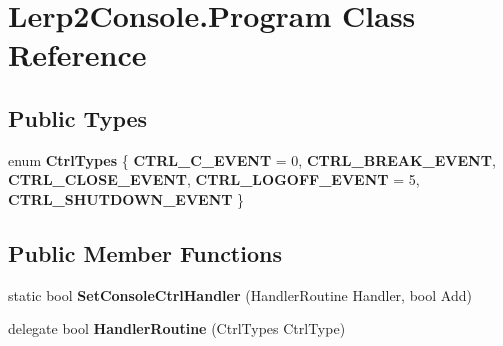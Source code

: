 \hypertarget{class_lerp2_console_1_1_program}{}\section{Lerp2\+Console.\+Program Class Reference}
\label{class_lerp2_console_1_1_program}
\subsection*{Public Types}
\begin{DoxyCompactItemize}
\item 
\mbox{\label{class_lerp2_console_1_1_program_a6449c3395adb6c08eee64948ff31cf41}} 
enum {\bfseries Ctrl\+Types} \{ \newline
{\bfseries C\+T\+R\+L\+\_\+\+C\+\_\+\+E\+V\+E\+NT} = 0, 
{\bfseries C\+T\+R\+L\+\_\+\+B\+R\+E\+A\+K\+\_\+\+E\+V\+E\+NT}, 
{\bfseries C\+T\+R\+L\+\_\+\+C\+L\+O\+S\+E\+\_\+\+E\+V\+E\+NT}, 
{\bfseries C\+T\+R\+L\+\_\+\+L\+O\+G\+O\+F\+F\+\_\+\+E\+V\+E\+NT} = 5, 
\newline
{\bfseries C\+T\+R\+L\+\_\+\+S\+H\+U\+T\+D\+O\+W\+N\+\_\+\+E\+V\+E\+NT}
 \}
\end{DoxyCompactItemize}
\subsection*{Public Member Functions}
\begin{DoxyCompactItemize}
\item 
\mbox{\label{class_lerp2_console_1_1_program_aa0840f9a141387941e7d12ae8d021137}} 
static bool {\bfseries Set\+Console\+Ctrl\+Handler} (Handler\+Routine Handler, bool Add)
\item 
\mbox{\label{class_lerp2_console_1_1_program_ac1511d0b80be63639fb28f914ab17e74}} 
delegate bool {\bfseries Handler\+Routine} (Ctrl\+Types Ctrl\+Type)
\end{DoxyCompactItemize}
